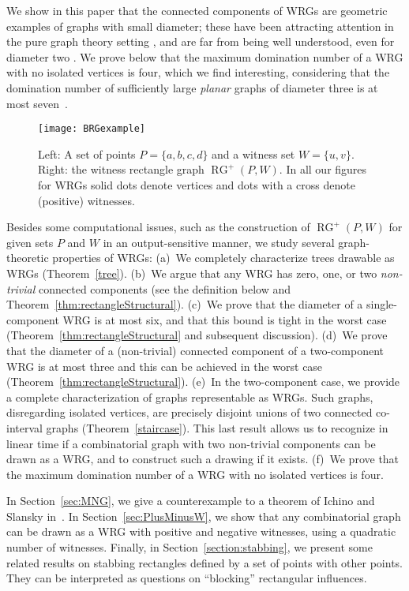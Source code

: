 \documentclass{llncs}
\DeclareMathOperator{\RG}{RG} \DeclareMathOperator{\RIG}{RIG} \DeclareMathOperator{\MNG}{MNG} \DeclareMathOperator{\GG}{GG} \DeclareMathOperator{\DG}{DG} \DeclareMathOperator{\WRG}{WRG}
\begin{document}
We show in this paper that the connected components of WRGs are geometric examples of graphs with small diameter; these have
  been attracting attention in the pure graph theory setting \cite{SmallDiameter1, SmallDiameter2}, and are far from being
  well understood, even for diameter two \cite{diameterTwo1,diameterTwo2,diameterTwo3}.
  We prove below that the maximum domination number of a WRG with no isolated vertices is four, which we find interesting, considering that the domination number of sufficiently large \emph{planar} graphs of diameter three is at most seven~\cite{Domination, Domination2}.

\begin{figure}[htbp!]
  \centering
  \texttt{[image: BRGexample]}
  \caption{Left: A set of points $P=\{a,b,c,d\}$ and a witness set
    $W=\{u,v\}$. Right: the witness rectangle graph $\RG^+(P,W)$.  In
    all our figures for WRGs solid dots denote vertices and dots with
    a cross denote (positive) witnesses.  }
  \label{fig:RGexample}
\end{figure}

Besides some computational issues, such as the construction of $\RG^+(P,W)$ for given sets $P$
and $W$ in an output-sensitive manner, we study several graph-theoretic properties of WRGs: (a)~We
completely characterize trees drawable as WRGs (Theorem~\ref{tree}).
(b)~We argue that any WRG has zero, one, or two \emph{non-trivial} connected
components (see the definition below and Theorem~\ref{thm:rectangleStructural}). (c)~We prove
that the diameter of a single-component WRG is at most six, and that this bound is tight in the worst case
(Theorem~\ref{thm:rectangleStructural} and subsequent discussion). (d)~We prove that the diameter
of a (non-trivial) connected component of a two-component WRG is at
most three and this can be achieved in the worst case
(Theorem~\ref{thm:rectangleStructural}).
(e)~In the two-component case, we provide a complete characterization
of graphs representable as WRGs. Such graphs, disregarding
isolated vertices, are precisely disjoint unions of two connected co-interval
graphs (Theorem~\ref{staircase}).
This last result allows us to recognize in linear time if a combinatorial graph with two
non-trivial components can be drawn as a WRG, and to construct such a drawing if it exists.
(f)~We prove that the maximum domination number of a WRG with no isolated vertices is four.



In Section~\ref{sec:MNG}, we give a counterexample to a theorem of
Ichino and Slansky in~\cite{MNG}.
In Section~\ref{sec:PlusMinusW}, we show that any combinatorial graph can be drawn as a WRG with positive and negative witnesses, using a quadratic number of witnesses.
Finally, in Section~\ref{section:stabbing}, we present some related
results on stabbing rectangles defined by a set of points with other
points.  They can be interpreted as questions on ``blocking''
rectangular influences.
\end{document}
